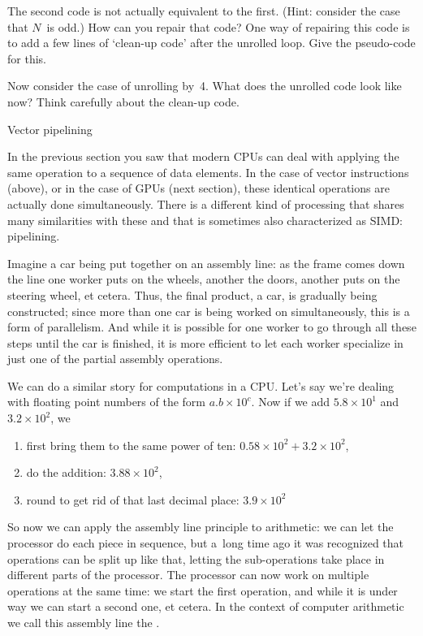 \begin{exercise}
  The second code is not actually equivalent to the first. (Hint:
  consider the case that $N$~is odd.) How can you repair that code?
  One way of repairing this code is to add a few lines of `clean-up code'
  after the unrolled loop. Give the pseudo-code for this.

  Now consider the case of unrolling by~4. What does the unrolled code
  look like now? Think carefully about the clean-up code.
\end{exercise}

 {Vector pipelining}
\label{sec:pipeline}

In the previous section you saw that modern CPUs can deal with
applying the same operation to a sequence of data elements.  In the
case of vector instructions (above), or in the case of GPUs (next
section), these identical operations are
actually done simultaneously. There is a different
kind of processing that shares many similarities with these
and that is sometimes also characterized as \ac{SIMD}:
pipelining.

Imagine a car being put together on an assembly line: as the frame comes
down the line one worker puts on the wheels, another the doors,
another puts on the steering wheel, et cetera. Thus, the final
product, a car, is gradually being constructed; since more than one
car is being worked on simultaneously, this is a form of
parallelism. And while it is
possible for one worker to go through all these steps
until the car is finished, it is more efficient to let each worker
specialize in just one of the partial assembly operations.

We can do a similar story for computations in a CPU. Let's say we're
dealing with floating point numbers of the form $a.b\times 10^c$.  Now
if we add $5.8\times 10^1$ and $3.2\times 10^2$, we
\begin{enumerate}
\item first bring them to the same power of ten: $0.58\times
  10^2+3.2\times 10^2$,
\item do the addition: $3.88\times 10^2$,
\item round to get rid of that last decimal place: $3.9\times 10^2$
\end{enumerate}
So now we can apply the assembly line principle to arithmetic: 
we can let the processor do each piece in sequence, but
a~long time ago it was recognized that operations can be split up like that,
letting the sub-operations take place in different parts of the processor.
%
The processor can now work on multiple operations at the same time: we
start the first operation, and while it is under way we can start a
second one, et cetera.  In the context of computer arithmetic we call
this assembly line the .

